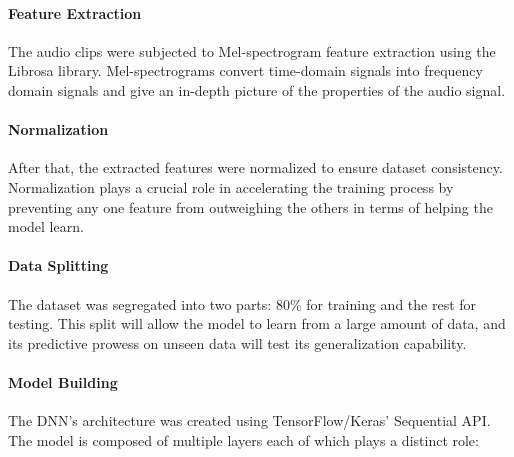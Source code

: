 \documentclass[conference]{IEEEtran}
\begin{document}
\paragraph{Feature Extraction}

The audio clips were subjected to Mel-spectrogram feature extraction using the Librosa library. Mel-spectrograms convert time-domain signals into frequency domain signals and give an in-depth picture of the properties of the audio signal.\cite{inproceedings}


\paragraph{Normalization}
After that, the extracted features were normalized to ensure dataset consistency. Normalization plays a crucial role in accelerating the training process by preventing any one feature from outweighing the others in terms of helping the model learn.

\paragraph{Data Splitting}
The dataset was segregated into two parts: 80\% for training and the rest for testing. This split will allow the model to learn from a large amount of data, and its predictive prowess on unseen data will test its generalization capability.


\paragraph{Model Building}
The DNN's architecture was created using TensorFlow/Keras' Sequential API. The model is composed of multiple layers each of which plays a distinct role:
\end{document}
